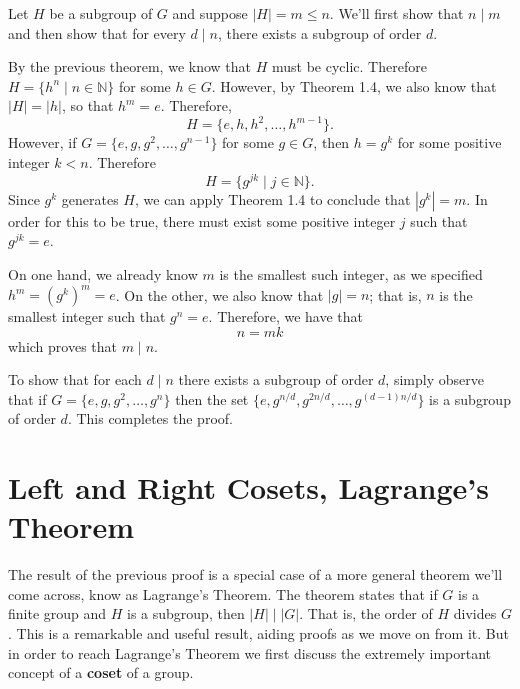     \begin{prf}
        Let $H$ be a subgroup of $G$ and suppose
        $|H| = m \le n$. We'll first show that $n \mid m$ and then
        show that for every $d \mid n$, there exists a subgroup of
        order $d$.

        By the previous theorem, we
        know that $H$ must be cyclic. Therefore $H = \{h^n \mid n \in
        \mathbb{N}\}$ for some $h \in G$. However, by Theorem 1.4, we
        also know that $|H| = |h|$, so that $h^m = e$. Therefore, 
        \[
            H = \{e, h, h^2, \dots, h^{m-1}\}.
        \] 
        However, if $G = \{e, g, g^2, \dots, g^{n-1}\}$ for some $g \in G$, then $h = g^k$ for some
        positive integer
        $k < n$. Therefore 
        \[
            H = \{g^{jk} \mid j \in \mathbb{N}\}.
        \]
        Since $g^k$ generates $H$, we can apply Theorem 1.4 to
        conclude that $|g^k| = m$. In order for this to be true, there must
        exist some positive integer $j$ such that $g^{jk} = e$.

        On one hand, we already know $m$ is the smallest such integer, as
        we specified $h^m = (g^k)^m = e$. On the other, we also know
        that $|g| = n$; that is, $n$ is the smallest integer such that
        $g^n = e$. Therefore, we have that 
        \[
            n = mk
        \]
        which proves that $m \mid n$. 

        To show that for each $d \mid n$ there exists a subgroup of
        order $d$, simply observe that if $G = \{e, g, g^2, \dots ,
        g^n\}$ then the set $\{e, g^{n/d}, g^{2n/d}, \dots,
        g^{(d-1)n/d}\}$ is a subgroup of order $d$. This completes the
        proof.
    \end{prf}

    \newpage
    \section{Left and Right Cosets, Lagrange's Theorem}

    The result of the previous proof is a special case of a more general
    theorem we'll come across, know as Lagrange's Theorem. The theorem
    states that if $G$ is a finite group and $H$ is a subgroup, then
    $|H| \mid |G|$. That is, the order of $H$ divides $G$. This is a
    remarkable and useful result, aiding proofs as we move on from it.
    But in order to reach Lagrange's Theorem we first discuss the
    extremely important concept of a \textbf{coset} of a group.

